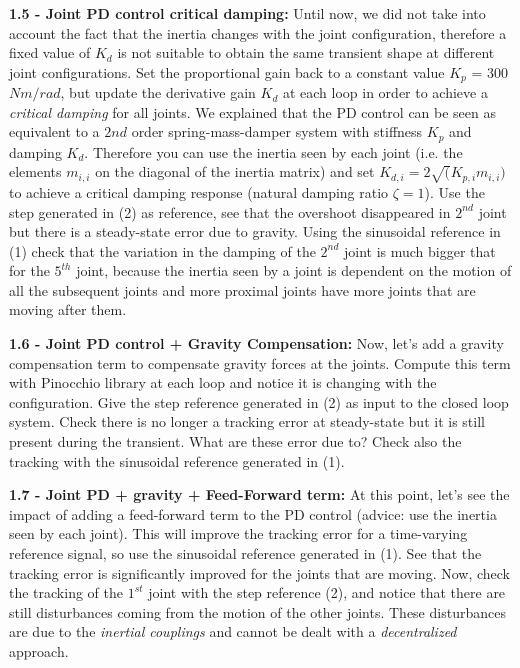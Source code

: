 \documentclass[11pt]{article}
\begin{document}
\quad

\noindent
\textbf{1.5 - Joint PD control critical damping:}
Until now, we did not take into account the fact that the inertia changes with the joint configuration, therefore a fixed value of $K_d$ is not suitable to obtain 
the same transient shape at different joint configurations. Set the proportional gain back to a constant value $K_p$ = 300 $Nm/rad$, but update the derivative gain 
$K_d$ at each loop in order to achieve a \textit{critical damping} for all  joints. We explained that the PD control can be seen as equivalent to a $2{nd}$ order 
spring-mass-damper system with stiffness $K_p$ and damping $K_d$. 
Therefore you can use the inertia seen by each joint (i.e. the elements $m_{i,i}$ on the diagonal 
of the inertia matrix) and set $K_{d,i} = 2\sqrt(K_{p,i} m_{i,i})$ to achieve a critical damping response (natural damping ratio $\zeta = 1$). Use the step 
generated in (2) as reference, see that the overshoot disappeared in $2^{nd}$ joint but there is a steady-state error due to gravity. Using the sinusoidal 
reference in (1) %
check that the variation in the damping of the $2^{nd}$ joint is much bigger that for the $5^{th}$ joint, because the inertia seen by a joint  is dependent on 
the motion of all the subsequent joints and more proximal joints have more joints that are moving after them.

\quad

\noindent
\textbf{1.6 - Joint PD control + Gravity Compensation:}
Now, let's add a gravity compensation term to compensate gravity forces at the joints. 
Compute this term with Pinocchio library at each loop and notice it is changing with the configuration. 
Give the step reference generated in (2) as input to the closed loop system. 
Check there is no longer a  tracking error at steady-state but it is still present during the transient. What are these error due to?
Check also the tracking with the sinusoidal reference generated in (1).

\quad

\noindent
\textbf{1.7 - Joint  PD + gravity + Feed-Forward term:}
At this point, let's see the impact of adding a feed-forward term to the PD control (advice: use the inertia seen by each joint). This will improve the tracking error for a time-varying reference signal, so use the sinusoidal reference generated in (1). See that the tracking error is significantly improved for the joints that are moving. Now, check the tracking of the $1^{st}$ joint with the step reference (2), and notice that there are still disturbances coming from the motion of the other joints. These disturbances are  due to the \textit{inertial couplings} and cannot be dealt with a \textit{decentralized} approach.
\end{document}
